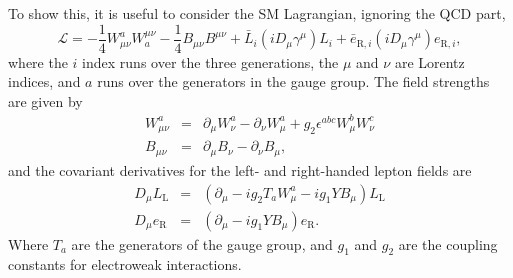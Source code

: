 To show this, it is useful to consider the SM Lagrangian, ignoring the
QCD part,
\begin{equation}
  \mathcal{L} =
  - \frac{1}{4} W_{\mu\nu}^{a} W_{a}^{\mu\nu}
  - \frac{1}{4} B_{\mu\nu} B^{\mu\nu}
  + \bar{L}_i \left(i D_{\mu} \gamma^{\mu} \right) L_i
  + \bar{e}_{\mathrm{R},i}\left(i D_{\mu} \gamma^{\mu}\right)e_{\mathrm{R},i},
\end{equation}
where the $i$ index runs over the three generations, the $\mu$ and $\nu$ are
Lorentz indices, and $a$ runs over the generators in the gauge group.
The field strengths are given by
\begin{eqnarray}
  W_{\mu\nu}^{a} & = &
  \partial_{\mu}W_{\nu}^{a} - 
  \partial_{\nu}W_{\mu}^{a} +
  g_{2}\epsilon^{abc}W_{\mu}^{b}W_{\nu}^{c}
  \\
  B_{\mu\nu} & = &
  \partial_{\mu}B_{\nu} - 
  \partial_{\nu}B_{\mu},
\end{eqnarray}
and the covariant derivatives for the left- and right-handed lepton fields are
\begin{eqnarray}
  D_{\mu}L_\mathrm{L} & = &
  \left(
    \partial_{\mu} - ig_{2}T_{a}W_{\mu}^{a} - ig_{1}YB_{\mu}
  \right) L_\mathrm{L}
  \\
  D_{\mu}e_\mathrm{R} & = &
  \left(
    \partial_{\mu} - ig_{1}YB_{\mu}
  \right) e_\mathrm{R}.
\end{eqnarray}
Where $T_a$ are the generators of the gauge group, and $g_1$ and $g_2$ are the
coupling constants for electroweak interactions.

